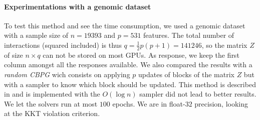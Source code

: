 \documentclass[a4]{article}
\begin{document}
\paragraph{Experimentations with a genomic dataset} \label{par:genom}

To test this method and see the time consumption, we used a genomic dataset \citep{Bessiere_Taha_Petitprez_Vandel_Marin_Brehelin_Lebre_Lecellier}
with a sample size of $n=19393$ and $p=531$ features.
The total number of interactions (squared included) is thus $q=\frac{1}{2}p(p+1)=141246$, so the matrix $Z$ of size $n\times q$
can not be stored on most GPUs. As response, we keep the first column amongst all the responses available.
We also compared the results with a \emph{random CBPG} wich consists on applying $p$ updates of blocks of the matrix $Z$ but with a sampler to know which block should be updated.
This method is described in  and is implemented with the $O(\log n)$ sampler did not lead to better results.
We let the solvers run at most $100$ epochs. We are in float-$32$ precision, looking at the KKT violation criterion.
\end{document}

